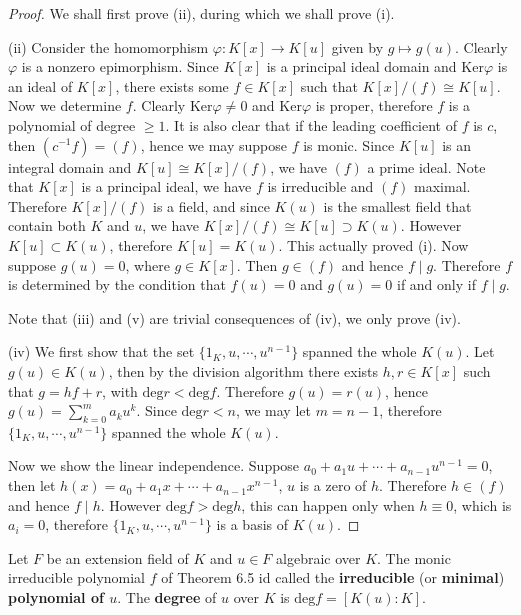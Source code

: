 \begin{proof}
We shall first prove (ii), during which we shall prove (i).\par
(ii) Consider the homomorphism $\varphi:K[x]\to K[u]$ given by $g\mapsto g(u)$. Clearly $\varphi$ is a nonzero epimorphism. Since $K[x]$ is a principal ideal domain and $\mathrm{Ker}\varphi$ is an ideal of $K[x]$, there exists some $f\in K[x]$ such that $K[x]/(f)\cong K[u]$. Now we determine $f$. Clearly $\mathrm{Ker}\varphi\ne 0$ and $\mathrm{Ker}\varphi$ is proper, therefore $f$ is a polynomial of degree $\ge 1$. It is also clear that if the leading coefficient of $f$ is $c$, then $(c^{-1}f)=(f)$, hence we may suppose $f$ is monic. Since $K[u]$ is an integral domain and $K[u]\cong K[x]/(f)$, we have $(f)$ a prime ideal. Note that $K[x]$ is a principal ideal, we have $f$ is irreducible and $(f)$ maximal. Therefore $K[x]/(f)$ is a field, and since $K(u)$ is the smallest field that contain both $K$ and $u$, we have $K[x]/(f)\cong K[u]\supset K(u)$. However $K[u]\subset K(u)$, therefore $K[u]=K(u)$. This actually proved (i). Now suppose $g(u)=0$, where $g\in K[x]$. Then $g\in (f)$ and hence $f\mid g$. Therefore $f$ is determined by the condition that $f(u)=0$ and $g(u)=0$ if and only if $f\mid g$.\par
Note that (iii) and (v) are trivial consequences of (iv), we only prove (iv).\par
(iv) We first show that the set $\{1_K,u,\cdots,u^{n-1}\}$ spanned the whole $K(u)$. Let $g(u)\in K(u)$, then by the division algorithm there exists $h,r\in K[x]$ such that $g=hf+r$, with $\mathrm{deg}r<\mathrm{deg}f$. Therefore $g(u)=r(u)$, hence $g(u)=\sum_{k=0}^ma_ku^k$. Since $\mathrm{deg}r<n$, we may let $m=n-1$, therefore $\{1_K,u,\cdots,u^{n-1}\}$ spanned the whole $K(u)$.\par
Now we show the linear independence. Suppose $a_0+a_1u+\cdots+a_{n-1}u^{n-1}=0$, then let $h(x)=a_0+a_1x+\cdots+a_{n-1}x^{n-1}$, $u$ is a zero of $h$. Therefore $h\in (f)$ and hence $f\mid h$. However $\mathrm{deg}f>\mathrm{deg}h$, this can happen only when $h\equiv 0$, which is $a_i=0$, therefore $\{1_K,u,\cdots,u^{n-1}\}$ is a basis of $K(u)$.
\end{proof}
\begin{definition}
Let $F$ be an extension field of $K$ and $u\in F$ algebraic over $K$. The monic irreducible polynomial $f$ of Theorem 6.5 id called the \textbf{irreducible} (or \textbf{minimal}) \textbf{polynomial of $u$}. The \textbf{degree} of $u$ over $K$ is $\mathrm{deg}f=[K(u):K]$.
\end{definition}
